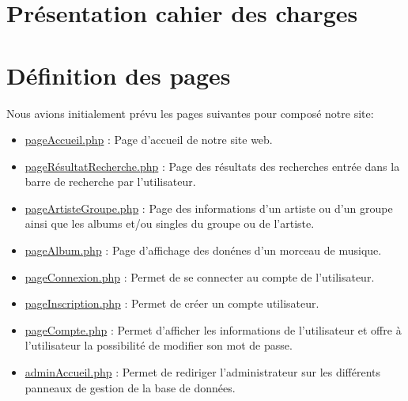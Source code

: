 
    \newpage

\section{Présentation cahier des charges}

\newpage

\section{Définition des pages}

	    	\begin{paragraphe}
	    	    Nous avions initialement prévu les pages suivantes pour composé notre site:\\
        		\begin{itemize}
        			\item \underline{pageAccueil.php} : Page d'accueil de notre site web.
        			\item \underline{pageRésultatRecherche.php} : Page des résultats des recherches entrée dans la barre de recherche par l'utilisateur.
        			\item \underline{pageArtisteGroupe.php} : Page des informations d'un artiste ou d'un groupe ainsi que les albums et/ou singles du groupe ou de l'artiste.
        			\item \underline{pageAlbum.php} : Page d'affichage des donénes d'un morceau de musique.
        		\end{itemize}
                \vspace{1em}
                \begin{itemize}
        			\item \underline{pageConnexion.php} : Permet de se connecter au compte de l'utilisateur.
        			\item \underline{pageInscription.php} : Permet de créer un compte utilisateur.
        			\item \underline{pageCompte.php} : Permet d'afficher les informations de l'utilisateur et offre à l'utilisateur la possibilité de modifier son mot de passe.
        		\end{itemize}
                \vspace{1em}
        		\begin{itemize}
        			\item \underline{adminAccueil.php} : Permet de rediriger l'administrateur sur les différents panneaux de gestion de la base de données.

\end{itemize}
\end{paragraphe}
